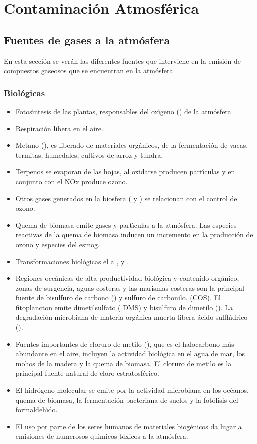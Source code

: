 \chapter{Contaminaci\'on Atmosf\'erica}

\section{Fuentes de gases a la atmósfera}

En esta sección se verán las diferentes fuentes que interviene en la emisión de compuestos gaseosos que se encuentran en la atmósfera

\subsection{Biológicas}\label{subbio}
\begin{itemize}
\item Fotos\'{\i}ntesis de las plantas, responsables del ox\'{\i}geno () de la atmósfera
\item  Respiración libera  en el aire.
\item  Metano (), es liberado de materiales orgánicos, de la fermentación de vacas, termitas, humedales, cultivos de arroz y tundra.
\item  Terpenos  se evaporan de las hojas, al oxidarse producen part\'{\i}culas y en conjunto con el NOx produce ozono. 
\item Otros gases generados en la biosfera ( y ) se relacionan con el control de ozono.
\item Quema de biomasa emite gases y part\'{\i}culas a la atmósfera. Las especies reactivas de la quema de biomasa inducen un incremento en la producción de ozono y especies del esmog.
\item  Transformaciones biológicas el  a ,  y .
\item Regiones oceánicas de alta productividad biológica y contenido orgánico, zonas de surgencia, aguas costeras y las marismas costeras son la principal fuente de bisulfuro de carbono ()  y sulfuro de carbonilo. (COS). El fitoplancton emite dimetilsulfato ( DMS) y bisulfuro de dimetilo (). La degradación microbiana de materia orgánica muerta libera ácido sulfh\'{\i}drico ().
\item Fuentes importantes de cloruro de metilo (), que es el halocarbono más abundante en el aire, incluyen la actividad biológica en el agua de mar, los mohos de la madera y la quema de biomasa. El cloruro de metilo es la principal fuente natural de cloro estratosférico.
\item El hidrógeno molecular se emite por la actividad microbiana en los océanos, quema de biomasa, la fermentación bacteriana de suelos y la fotólisis del formaldeh\'{\i}do.
\item El uso por parte de los seres humanos de materiales biogénicos da lugar a emisiones de numerosos qu\'{\i}micos tóxicos a la atmósfera.
\end{itemize}
